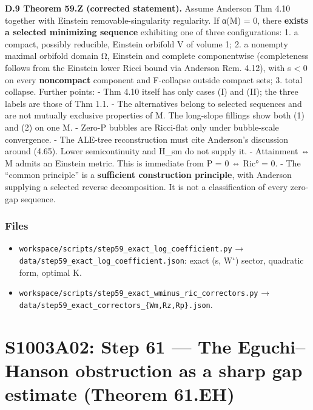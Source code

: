 \documentclass[
  10pt,
]{report}
\providecommand{\tightlist}{%
  \setlength{\itemsep}{0pt}\setlength{\parskip}{0pt}}
\begin{document}
\textbf{D.9 Theorem 59.Z (corrected statement).} Assume Anderson Thm
4.10 together with Einstein removable-singularity regularity. If α(M) =
0, there \textbf{exists a selected minimizing sequence} exhibiting one
of three configurations: 1. a compact, possibly reducible, Einstein
orbifold V of volume 1; 2. a nonempty maximal orbifold domain Ω,
Einstein and complete componentwise (completeness follows from the
Einstein lower Ricci bound via Anderson Rem. 4.12), with s \textless{} 0
on every \textbf{noncompact} component and F-collapse outside compact
sets; 3. total collapse. Further points: - Thm 4.10 itself has only
cases (I) and (II); the three labels are those of Thm 1.1. - The
alternatives belong to selected sequences and are not mutually exclusive
properties of M. The long-slope fillings show both (1) and (2) on one M.
- Zero-P bubbles are Ricci-flat only under bubble-scale convergence. -
The ALE-tree reconstruction must cite Anderson's discussion around
(4.65). Lower semicontinuity and H\_sm do not supply it. - Attainment ⇔
M admits an Einstein metric. This is immediate from P = 0 ⇔ Ric° = 0. -
The ``common principle'' is a \textbf{sufficient construction
principle}, with Anderson supplying a selected reverse decomposition. It
is not a classification of every zero-gap sequence.

\hypertarget{files}{%
\subsection{Files}\label{files}}

\begin{itemize}
\tightlist
\item
  \texttt{workspace/scripts/step59\_exact\_log\_coefficient.py} →
  \texttt{data/step59\_exact\_log\_coefficient.json}: exact (s, W⁺)
  sector, quadratic form, optimal K.
\item
  \texttt{workspace/scripts/step59\_exact\_wminus\_ric\_correctors.py} →
  \texttt{data/step59\_exact\_correctors\_\{Wm,Rz,Rp\}.json}.
\end{itemize}

\hypertarget{s1003a02-step-61-the-eguchihanson-obstruction-as-a-sharp-gap-estimate-theorem-61.eh}{%
\chapter{S1003A02: Step 61 --- The Eguchi--Hanson obstruction as a sharp
gap estimate (Theorem
61.EH)}\label{s1003a02-step-61-the-eguchihanson-obstruction-as-a-sharp-gap-estimate-theorem-61.eh}}
\end{document}
